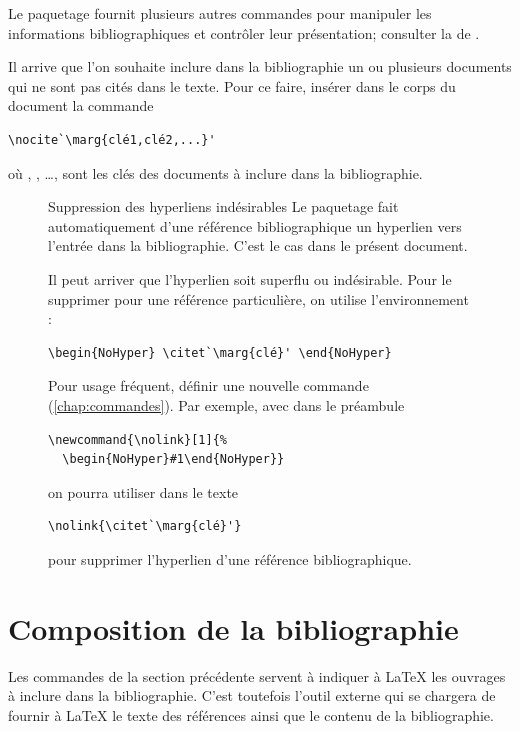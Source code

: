 Le paquetage fournit plusieurs autres commandes pour manipuler les
informations bibliographiques et contrôler leur présentation;
consulter la %
de .

Il arrive que l'on souhaite inclure dans la bibliographie un ou
plusieurs documents qui ne sont pas cités dans le texte. Pour ce
faire, insérer dans le corps du document la commande
\begin{lstlisting}
\nocite`\marg{clé1,clé2,...}'
\end{lstlisting}
où , , \dots, sont les clés des documents à
inclure dans la bibliographie.

\begin{figure}[t]
  \begin{emphbox}{Suppression des hyperliens indésirables}
    Le paquetage  fait automatiquement d'une référence
    bibliographique un hyperlien vers l'entrée dans la bibliographie.
    C'est le cas dans le présent document.

    Il peut arriver que l'hyperlien soit superflu ou indésirable. Pour
    le supprimer pour une référence particulière, on utilise
    l'environnement :
\begin{lstlisting}
\begin{NoHyper} \citet`\marg{clé}' \end{NoHyper}
\end{lstlisting}
    Pour usage fréquent, définir une nouvelle commande
    (\autoref{chap:commandes}). Par exemple, avec dans le préambule
\begin{lstlisting}
\newcommand{\nolink}[1]{%
  \begin{NoHyper}#1\end{NoHyper}}
\end{lstlisting}
    on pourra utiliser dans le texte
\begin{lstlisting}
\nolink{\citet`\marg{clé}'}
\end{lstlisting}
    pour supprimer l'hyperlien d'une référence bibliographique.
  \end{emphbox}
\end{figure}


\section{Composition de la bibliographie}
\label{sec:bibliographie:bibtex}

Les commandes de la section précédente servent à indiquer à {\LaTeX}
les ouvrages à inclure dans la bibliographie. C'est toutefois l'outil
externe {\BibTeX} qui se chargera de fournir à {\LaTeX} le texte des
références ainsi que le contenu de la bibliographie.

